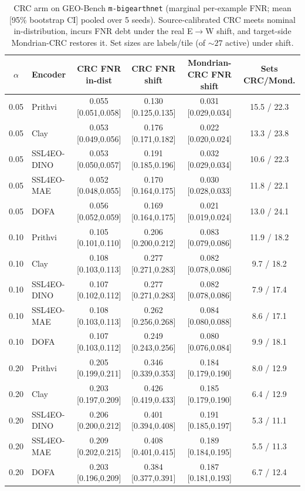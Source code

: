 \documentclass[11pt]{article}
\begin{document}
\begin{table}[t]\centering\small
\caption{CRC arm on GEO-Bench \texttt{m-bigearthnet} (marginal per-example FNR; mean [95\% bootstrap CI]
pooled over 5 seeds). Source-calibrated CRC meets nominal in-distribution, incurs FNR debt under the real
E$\to$W shift, and target-side Mondrian-CRC restores it. Set sizes are labels/tile (of ${\sim}27$ active)
under shift.}\label{tab:crc}
\begin{tabular}{clcccc}
\toprule
$\alpha$ & Encoder & CRC FNR in-dist & CRC FNR shift & Mondrian-CRC FNR shift & Sets CRC/Mond. \\
\midrule
0.05 & Prithvi & 0.055 [0.051,0.058] & 0.130 [0.125,0.135] & 0.031 [0.029,0.034] & 15.5 / 22.3 \\
0.05 & Clay & 0.053 [0.049,0.056] & 0.176 [0.171,0.182] & 0.022 [0.020,0.024] & 13.3 / 23.8 \\
0.05 & SSL4EO-DINO & 0.053 [0.050,0.057] & 0.191 [0.185,0.196] & 0.032 [0.029,0.034] & 10.6 / 22.3 \\
0.05 & SSL4EO-MAE & 0.052 [0.048,0.055] & 0.170 [0.164,0.175] & 0.030 [0.028,0.033] & 11.8 / 22.1 \\
0.05 & DOFA & 0.056 [0.052,0.059] & 0.169 [0.164,0.175] & 0.021 [0.019,0.024] & 13.0 / 24.1 \\
\midrule
0.10 & Prithvi & 0.105 [0.101,0.110] & 0.206 [0.200,0.212] & 0.083 [0.079,0.086] & 11.9 / 18.2 \\
0.10 & Clay & 0.108 [0.103,0.113] & 0.277 [0.271,0.283] & 0.082 [0.078,0.086] & 9.7 / 18.2 \\
0.10 & SSL4EO-DINO & 0.107 [0.102,0.112] & 0.277 [0.271,0.283] & 0.082 [0.078,0.086] & 7.9 / 17.4 \\
0.10 & SSL4EO-MAE & 0.108 [0.103,0.113] & 0.262 [0.256,0.268] & 0.084 [0.080,0.088] & 8.6 / 17.1 \\
0.10 & DOFA & 0.107 [0.103,0.112] & 0.249 [0.243,0.256] & 0.080 [0.076,0.084] & 9.9 / 18.1 \\
\midrule
0.20 & Prithvi & 0.205 [0.199,0.211] & 0.346 [0.339,0.353] & 0.184 [0.179,0.190] & 8.0 / 12.9 \\
0.20 & Clay & 0.203 [0.197,0.209] & 0.426 [0.419,0.433] & 0.185 [0.179,0.190] & 6.4 / 12.9 \\
0.20 & SSL4EO-DINO & 0.206 [0.200,0.212] & 0.401 [0.394,0.408] & 0.191 [0.185,0.197] & 5.3 / 11.1 \\
0.20 & SSL4EO-MAE & 0.209 [0.202,0.215] & 0.408 [0.401,0.415] & 0.189 [0.184,0.195] & 5.5 / 11.3 \\
0.20 & DOFA & 0.203 [0.196,0.209] & 0.384 [0.377,0.391] & 0.187 [0.181,0.193] & 6.7 / 12.4 \\
\bottomrule
\end{tabular}
\end{table}
\end{document}
